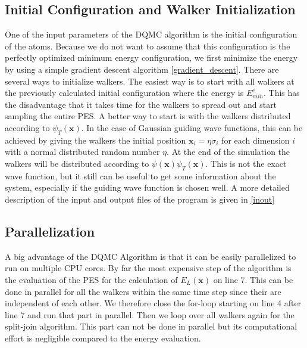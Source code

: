 \documentclass [12pt]{report}
\begin{document}
\subsection{Initial Configuration and Walker Initialization} \label{init}
One of the input parameters of the DQMC algorithm is the initial configuration of the atoms. Because we do not want to assume that this configuration is the perfectly optimized minimum energy configuration, we first minimize the energy by using a simple gradient descent algorithm \ref{gradient_descent}.
There are several ways to initialize walkers. The easiest way is to start with all walkers at the previously calculated initial configuration where the energy is $E^e_{min}$. This has the disadvantage that it takes time for the walkers to spread out and start sampling the entire PES. A better way to start  is with the walkers distributed according to $\psi_T(\bm{x})$. In the case of Gaussian guiding wave functions, this can be achieved by giving the walkers the initial position $\bm{x}_i = \eta \sigma_i$ for each dimension $i$ with a normal distributed random number $\eta$.
At the end of the simulation the walkers will be distributed according to $\psi(\bm{x})\psi_T(\bm{x})$. This is not the exact wave function, but it still can be useful to get some information about the system, especially if the guiding wave function is chosen well. A more detailed description of the input and output files of the program is given in \ref{inout}
\subsection{Parallelization}
A big advantage of the DQMC Algorithm is that it can be easily parallelized to run on multiple CPU cores. By far the most expensive step of the algorithm is the evaluation of the PES for the calculation of $E_L(\bm{x})$ on line 7. This can be done in parallel for all the walkers within the same time step since their are independent of each other. We therefore close the for-loop starting on line 4 after line 7 and run that part in parallel. Then we loop over all walkers again for the split-join algorithm. This part can not be done in parallel but its computational effort is negligible compared to the energy evaluation.
\end{document}
